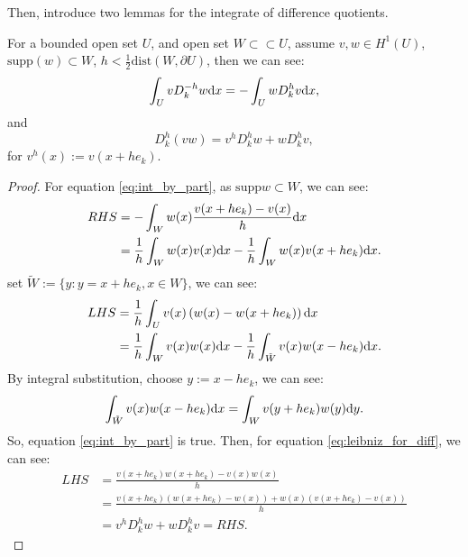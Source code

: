 Then, introduce two lemmas for the integrate of difference quotients.
\begin{lemma}
    \label{lem:diff_quo}
    For a bounded open set $U$, and open set $W\subset\subset U$, 
    assume $v,w\in H^{1}(U)$,  $\text{supp}(w)\subset W$, $h<\frac{1}{2}\text{dist}(W,\partial U)$, then we can see:
    \begin{equation}
        \label{eq:int_by_part}
        \int_{U}vD_{k}^{-h}w\mathrm{d} x=-\int_{U}wD_{k}^{h}v\mathrm{d} x,
    \end{equation}
    and  
    \begin{equation}
        \label{eq:leibniz_for_diff}
        D_{k}^{h}(vw)=v^{h}D_{k}^{h}w+wD_{k}^{h}v,
    \end{equation}
    for $v^{h}(x):=v(x+he_{k})$.
\end{lemma}
\begin{proof}
    For equation \eqref{eq:int_by_part}, as $\text{supp} w\subset W$, we can see:
    \begin{equation}
        \begin{aligned}
        RHS&=-\int_{W}w(x)\frac{v(x+he_{k})-v(x)}{h}\mathrm{d} x\\
        &=\frac{1}{h}\int_{W}w(x)v(x)\mathrm{d} x-\frac{1}{h}\int_{W}w(x)v(x+he_{k})\mathrm{d} x.
        \end{aligned}
    \end{equation}
    set $\tilde{W}:=\{y:y=x+he_{k},x\in W\}$, we can see:
    \begin{equation}
        \begin{aligned}
            LHS&=\frac{1}{h}\int_{U}v(x)\left(w(x)-w(x+he_{k})\right)\mathrm{d} x\\
            &=\frac{1}{h}\int_{W}v(x)w(x)\mathrm{d} x-\frac{1}{h}\int_{\tilde{W}}v(x)w(x-he_{k})\mathrm{d} x.
        \end{aligned}
    \end{equation}
    By integral substitution, choose $y:=x-he_{k}$, we can see:
    \begin{equation}
        \int_{\tilde{W}}v(x)w(x-he_{k})\mathrm{d} x=\int_{W}v(y+he_{k})w(y)\mathrm{d} y.
    \end{equation}
    So, equation \eqref{eq:int_by_part} is true. Then, for equation \eqref{eq:leibniz_for_diff}, we can see:
    \begin{equation}
        \begin{aligned}
            LHS&=\frac{v(x+he_{k})w(x+he_{k})-v(x)w(x)}{h}\\
            &=\frac{v(x+he_{k})(w(x+he_{k})-w(x))+w(x)(v(x+he_{k})-v(x))}{h}\\
            &=v^{h}D_{k}^{h}w+wD_{k}^{h}v=RHS.
        \end{aligned}
    \end{equation}
\end{proof}
